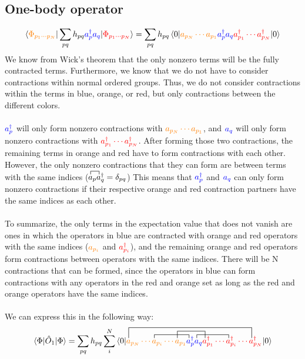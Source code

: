 \documentclass{article}
\newcommand{\dg}{\ensuremath{^\dagger} }
\newcommand{\cd}{\ensuremath{\cdots} }
\begin{document}
\subsection{One-body operator}
\[\braket{{\color{orange} \Phi_{p_1 \cd p_N} } | \sum_{pq}   h_{pq}{\color{blue}  a_p^\dagger a_q } | {\color{red} \Phi_{p_1 \cd p_N}}} = 
\sum_{pq}   h_{pq} \braket{ 0| {\color{orange} a_{p_N} \cd a_{p_1} } {\color{blue} a_p^\dagger a_q } {\color{red} a_{p_1}\dg \cd a_{p_N}\dg }| 0} \]
We know from Wick's theorem that the only nonzero terms will be the fully contracted terms. 
Furthermore, we know that we do not have to consider contractions within normal ordered groups. 
Thus, we do not consider contractions within the terms in blue, orange, or red, but only contractions between the different colors.  \\ \\ 
$ {\color{blue} a_p^\dagger}$ will only form nonzero contractions with ${\color{orange} a_{p_N} \cd a_{p_1} } $, and 
$ {\color{blue} a_q }$ will only form nonzero contractions with ${\color{red} a_{p_1}\dg \cd a_{p_N}\dg }$. 
After forming those two contractions, the remaining terms in orange and red have to form contractions with each other. 
However, the only nonzero contractions that they can form are between terms with the same indices ($\contraction{}{a}{{}_p}{a} a_p a_q\dg =  \delta_{pq}$)
This means that $ {\color{blue} a_p^\dagger}$ and  $ {\color{blue} a_q }$ can only form nonzero contractions if their respective orange and red contraction partners have the same indices as each other. 
\\ \\
To summarize, the only terms in the expectation value that does not vanish are ones in which the operators in blue are contracted with orange and red operators with the same indices (${\color{orange} a_{p_i} } $ and 
${\color{red} a_{p_i}\dg}$), and the remaining orange and red operators form contractions between operators with the same indices. There will be N contractions that can be formed, since the operators in blue can form 
contractions with any operators in the red and orange set as long as the red and orange operators have the same indices.  \\ \\
We can express this in the following way: 
\[\braket{\Phi | \hat{O}_1 | \Phi} = \sum_{pq}   h_{pq} \sum_i^N \braket{0| 
\contraction{a_{p_N} \cd}{a}{{}_{p_i} \cd  a_{p_1} }{a}  
\contraction{{\color{orange} a_{p_N} \cd a_{p_i} \cd  a_{p_1} } a_p^\dagger}{a}{{}_q a_{p_1}\dg \cd}{a}
\contraction[2ex]{ a_{p_N} \cd a_{p_i} \cd }{a}{{}_{p_1}  a_p^\dagger a_q }{a}
\contraction[3ex]{}{a}{{}_{p_N} \cd a_{p_i} \cd  a_{p_1}{\color{blue} a_p^\dagger a_q } a_{p_1}\dg \cd a_{p_i}\dg \cd}{a}
{\color{orange} a_{p_N} \cd a_{p_i} \cd  a_{p_1} } {\color{blue} a_p^\dagger a_q } {\color{red} a_{p_1}\dg \cd a_{p_i}\dg \cd a_{p_N}\dg } |0} \]
\end{document}

